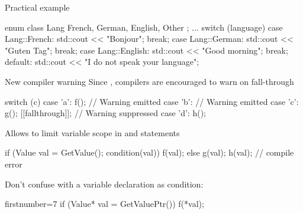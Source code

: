 \begin{frame}[fragile]
  \begin{exampleblock}{Practical example}
    \begin{cppcode*}{}
      enum class Lang { French, German, English, Other };
      ...
      switch (language) {
      case Lang::French:
        std::cout << "Bonjour";
        break;
       case Lang::German:
        std::cout << "Guten Tag";
        break;
      case Lang::English:
        std::cout << "Good morning";
        break;
      default:
        std::cout << "I do not speak your language";
      }
    \end{cppcode*}
  \end{exampleblock}
\end{frame}


\begin{frame}[fragile]
  \begin{block}{New compiler warning}
    Since , compilers are encouraged to warn on fall-through
  \end{block}
  \begin{exampleblock}{}
    \begin{cppcode*}{}
      switch (c) {
        case 'a':
          f();    // Warning emitted
        case 'b': // Warning emitted
        case 'c':
          g();
          [[fallthrough]]; // Warning suppressed
        case 'd':
          h();
      }
    \end{cppcode*}
  \end{exampleblock}
\end{frame}

\begin{frame}[fragile]
  \begin{block}{}
    Allows to limit variable scope in  and  statements
  \end{block}
  \begin{exampleblock}{}
    \begin{cppcode*}{}
      if (Value val = GetValue(); condition(val)) {
        f(val);
      } else {
        g(val);
      }
      h(val); // compile error
    \end{cppcode*}
  \end{exampleblock}
  \pause
  \begin{alertblock}{}
    Don't confuse with a variable declaration as condition:
    \begin{cppcode*}{firstnumber=7}
      if (Value* val = GetValuePtr())
        f(*val);
    \end{cppcode*}
  \end{alertblock}
\end{frame}

